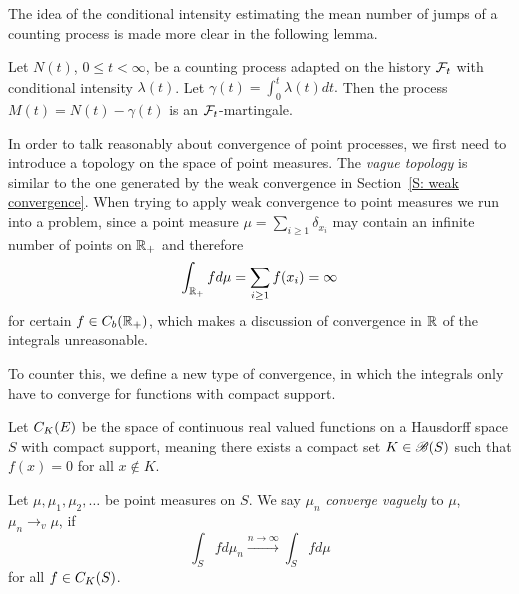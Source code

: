 The idea of the conditional intensity estimating the mean number of jumps of a counting process
is made more clear in the following lemma.

\begin{lemma}
	Let $N(t)$, $0 \leq t < \infty$, be a counting process adapted on the history $\mathcal{F}_{t}$
	with conditional intensity $\lambda(t)$.
	Let
	\begin{math}
		\gamma(t) = \int_0^t \lambda(t)dt.
	\end{math}
	Then the process $M(t) = N(t) - \gamma(t)$ is an $\mathcal{F}_{t}$-martingale.
\end{lemma}

\bigskip

In order to talk reasonably about convergence of point processes,
we first need to introduce a topology on the space of point measures.
The \emph{vague topology} is similar to the one generated by the weak convergence in Section~\ref{S: weak convergence}.
When trying to apply weak convergence to point measures we run into a problem,
since a point measure $\mu = \sum_{i \geq 1} \delta_{x_i}$ may contain an infinite number of points on $\mathbb{R}_+$
and therefore
\begin{equation*}
	\int_{\mathbb{R}_+} fd\mu = \sum_{i \geq 1} f(x_i) = \infty
\end{equation*}
for certain $f \in C_b(\mathbb{R}_+)$, which makes a discussion of convergence in $\mathbb{R}$ of the integrals unreasonable.

To counter this, we define a new type of convergence, 
in which the integrals only have to converge for functions with compact support.

\begin{definition} \label{D: vague convergence}
	Let $C_K(E)$ be the space of continuous real valued functions on a Hausdorff space $S$ with compact support,
	meaning there exists a compact set $K \in \mathscr{B}(S)$ such that $f(x) = 0$ for all $x \notin K$.
	
	Let $\mu, \mu_1, \mu_2, \dots$ be point measures on $S$.
	We say $\mu_n$ \emph{converge vaguely} to $\mu$, $\mu_n \rightarrow_v \mu$, if
	\begin{equation}
		\int_{S} fd\mu_n \xrightarrow{n \rightarrow \infty} \int_{S} fd\mu
	\end{equation}
	for all $f \in C_K(S)$.
\end{definition}

